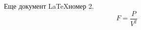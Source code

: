 \documentclass{article}
\begin{document}
Еще документ \LaTeX номер 2.
$$ F=\frac{P}{V^2} $$
\end{document}
